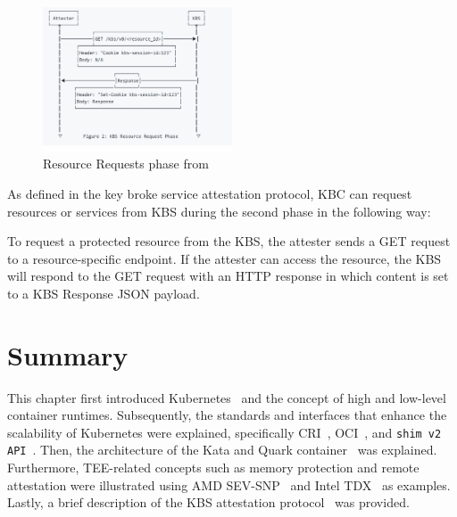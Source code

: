 \begin{figure}[htp]
    \centering
    \includegraphics[width=0.5\textwidth]{images/resourcerequrie.PNG}
    \caption[Resource Requests phase]{Resource Requests phase from~\cite*{kbs_Attestation_protocol}}
    \label{fig:resourcerequrie}
\end{figure}
As defined in the key broke service attestation protocol, \acrshort{KBC} can request resources or services from KBS during the second phase in the following way:
\begin{displayquote}
  To request a protected resource from the KBS, the attester sends a GET request to a resource-specific endpoint. If the attester can access the resource, the KBS will respond to the GET request with an HTTP response in which content is set to a KBS Response JSON payload.
\end{displayquote}


\section{Summary}
This chapter first introduced Kubernetes~\cite*{k8s} and the concept of high and low-level container runtimes. Subsequently, the standards and interfaces that enhance the scalability of Kubernetes were explained, specifically CRI~\cite*{cri-interface}, OCI~\cite*{oci-runtime-spec}, and 
\texttt{shim v2 API}~\cite*{shim_v2}.
Then, the architecture of the Kata and Quark container~\cite*{Kata-Containers, quark} was explained. Furthermore, TEE-related concepts such as memory protection and remote attestation were illustrated using AMD SEV-SNP~\cite*{SEV_SNP_white_book} and Intel TDX~\cite*{Intel_tdx_whitepaper} as 
examples. Lastly, a brief description of the KBS attestation protocol~\cite*{kbs_Attestation_protocol} was provided.
\cleardoublepage

